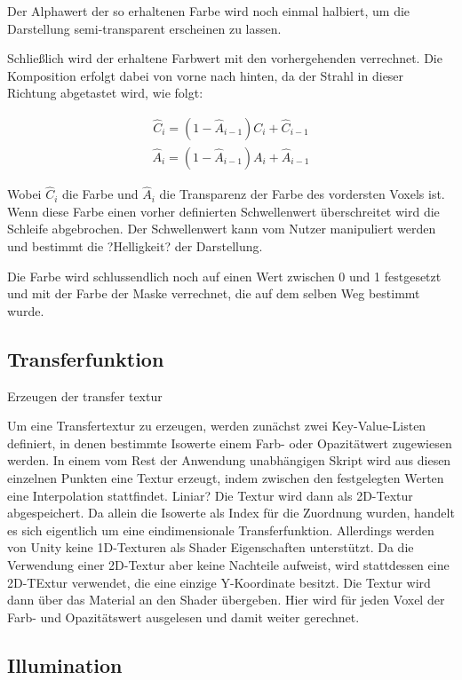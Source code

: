 Der Alphawert der so erhaltenen Farbe wird noch einmal halbiert, um die Darstellung semi-transparent erscheinen zu lassen.

Schließlich wird der erhaltene Farbwert mit den vorhergehenden verrechnet. Die Komposition erfolgt dabei von vorne nach hinten, da der Strahl in dieser Richtung abgetastet wird, wie folgt:

\begin{align}
\hat{C}_{i}=(1-\hat{A}_{i-1})C_{i}+\hat{C}_{i-1}
\end{align}
\begin{align}
\hat{A}_{i}=(1-\hat{A}_{i-1})A_{i}+\hat{A}_{i-1}
\end{align}

Wobei $\hat{C}_{i}$ die Farbe und $\hat{A}_{i}$ die Transparenz der Farbe des vordersten Voxels ist.
Wenn diese Farbe einen vorher definierten Schwellenwert überschreitet wird die Schleife abgebrochen. Der Schwellenwert kann vom Nutzer manipuliert werden und bestimmt die ?Helligkeit? der Darstellung.

Die Farbe wird schlussendlich noch auf einen Wert zwischen 0 und 1 festgesetzt und mit der Farbe der Maske verrechnet, die auf dem selben Weg bestimmt wurde.

\subsection{Transferfunktion}
\label{transfer}

Erzeugen der transfer textur

Um eine Transfertextur zu erzeugen, werden zunächst zwei Key-Value-Listen definiert, in denen bestimmte Isowerte einem Farb- oder Opazitätwert zugewiesen werden. In einem vom Rest der Anwendung unabhängigen Skript wird aus diesen einzelnen Punkten eine Textur erzeugt, indem zwischen den festgelegten Werten eine Interpolation stattfindet.
Liniar?
Die Textur wird dann als 2D-Textur abgespeichert. Da allein die Isowerte als Index für die Zuordnung wurden, handelt es sich eigentlich um eine eindimensionale Transferfunktion. 
Allerdings werden von Unity keine 1D-Texturen als Shader Eigenschaften unterstützt. Da die Verwendung einer 2D-Textur aber keine Nachteile aufweist, wird stattdessen eine 2D-TExtur verwendet, die eine einzige Y-Koordinate besitzt. 
Die Textur wird dann über das Material an den Shader übergeben. Hier wird für jeden Voxel der Farb- und Opazitätswert ausgelesen und damit weiter gerechnet. 

\subsection{Illumination}
\label{illumination}

